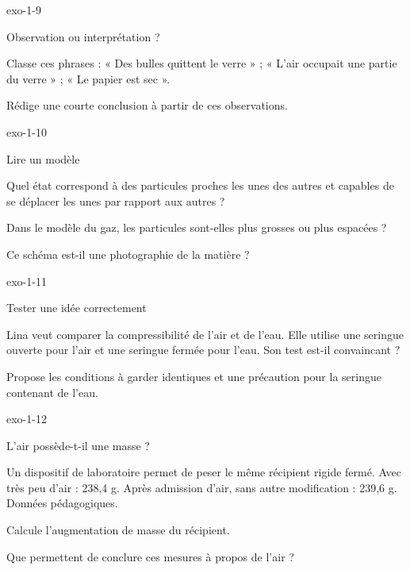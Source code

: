 \documentclass[12pt,twoside,openany]{book}
\begin{document}
\begin{blocLivre}{exo-1-9}
\begin{exercice}[2]{Observation ou interprétation ?}
\begin{questions}
\item Classe ces phrases : « Des bulles quittent le verre » ; « L’air occupait une partie du verre » ; « Le papier est sec ».
\item Rédige une courte conclusion à partir de ces observations.
\end{questions}
\end{exercice}\end{blocLivre}
\begin{blocLivre}{exo-1-10}
\begin{exercice}[2]{Lire un modèle}
\begin{questions}
\item Quel état correspond à des particules proches les unes des autres et capables de se déplacer les unes par rapport aux autres ?
\item Dans le modèle du gaz, les particules sont-elles plus grosses ou plus espacées ?
\item Ce schéma est-il une photographie de la matière ?
\end{questions}
\end{exercice}\end{blocLivre}
\begin{blocLivre}{exo-1-11}
\begin{exercice}[2]{Tester une idée correctement}
\begin{questions}
\item Lina veut comparer la compressibilité de l’air et de l’eau. Elle utilise une seringue ouverte pour l’air et une seringue fermée pour l’eau. Son test est-il convaincant ?
\item Propose les conditions à garder identiques et une précaution pour la seringue contenant de l’eau.
\end{questions}
\end{exercice}\end{blocLivre}
\begin{blocLivre}{exo-1-12}
\begin{exercice}[3]{L’air possède-t-il une masse ?}
\begin{donnees}Un dispositif de laboratoire permet de peser le même récipient rigide fermé. Avec très peu d’air : 238,4 g. Après admission d’air, sans autre modification : 239,6 g. Données pédagogiques.\par
\end{donnees}
\begin{questions}
\item Calcule l’augmentation de masse du récipient.
\item Que permettent de conclure ces mesures à propos de l’air ?
\end{questions}
\end{exercice}\end{blocLivre}
\end{document}
